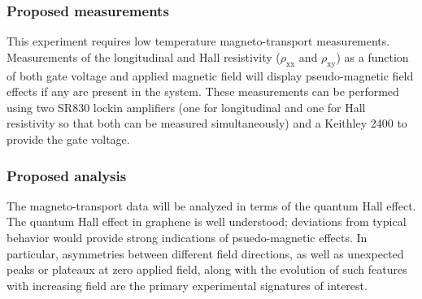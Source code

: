 \documentclass[edeposit,fullpage,draftthesis]{uiucthesis2009}
\begin{document}
            \subsubsection*{Proposed measurements}
            
            This experiment requires low temperature magneto-transport measurements.
            Measurements of the longitudinal and Hall resistivity ($\rho_\text{xx}$ and $\rho_\text{xy}$) as a
            function of both gate voltage and applied magnetic field will display pseudo-magnetic field effects
            if any are present in the system.
            These measurements can be performed using two SR830 lockin amplifiers (one for longitudinal and
            one for Hall resistivity so that both can be measured simultaneously) and a Keithley 2400
            to provide the gate voltage.
            
            \subsubsection*{Proposed analysis}
            
            The magneto-transport data will be analyzed in terms of the quantum Hall effect. The quantum
            Hall effect in graphene is well understood; deviations from typical behavior would provide
            strong indications of psuedo-magnetic effects. In particular, asymmetries between different
            field directions, as well as unexpected peaks or plateaux at zero applied field, along with
            the evolution of such features with increasing field are the primary experimental signatures
            of interest.
            
   
\end{document}
